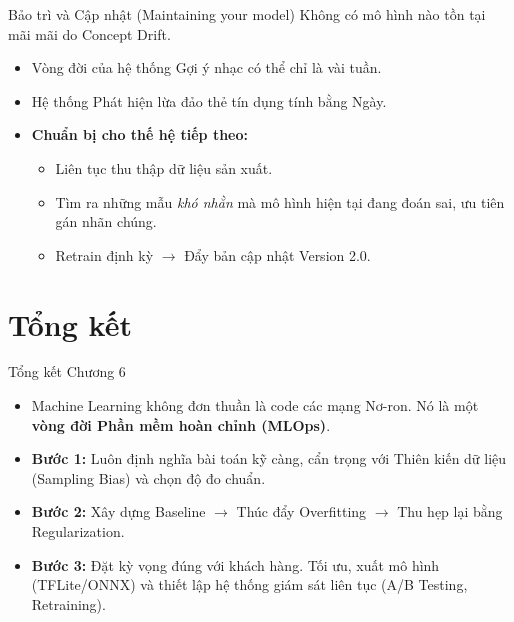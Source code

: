 \documentclass[aspectratio=169]{beamer}
\begin{document}
\begin{frame}{Bảo trì và Cập nhật (Maintaining your model)}
    Không có mô hình nào tồn tại mãi mãi do Concept Drift.
    \begin{itemize}
        \item Vòng đời của hệ thống Gợi ý nhạc có thể chỉ là vài tuần.
        \item Hệ thống Phát hiện lừa đảo thẻ tín dụng tính bằng Ngày.
        \item \textbf{Chuẩn bị cho thế hệ tiếp theo:}
        \begin{itemize}
            \item Liên tục thu thập dữ liệu sản xuất.
            \item Tìm ra những mẫu \textit{khó nhằn} mà mô hình hiện tại đang đoán sai, ưu tiên gán nhãn chúng.
            \item Retrain định kỳ $\rightarrow$ Đẩy bản cập nhật Version 2.0.
        \end{itemize}
    \end{itemize}
\end{frame}

\section{Tổng kết}

\begin{frame}{Tổng kết Chương 6}
    \begin{itemize}
        \item Machine Learning không đơn thuần là code các mạng Nơ-ron. Nó là một \textbf{vòng đời Phần mềm hoàn chỉnh (MLOps)}.
        \item \textbf{Bước 1:} Luôn định nghĩa bài toán kỹ càng, cẩn trọng với Thiên kiến dữ liệu (Sampling Bias) và chọn độ đo chuẩn.
        \item \textbf{Bước 2:} Xây dựng Baseline $\rightarrow$ Thúc đẩy Overfitting $\rightarrow$ Thu hẹp lại bằng Regularization.
        \item \textbf{Bước 3:} Đặt kỳ vọng đúng với khách hàng. Tối ưu, xuất mô hình (TFLite/ONNX) và thiết lập hệ thống giám sát liên tục (A/B Testing, Retraining).
    \end{itemize}
\end{frame}
\end{document}
